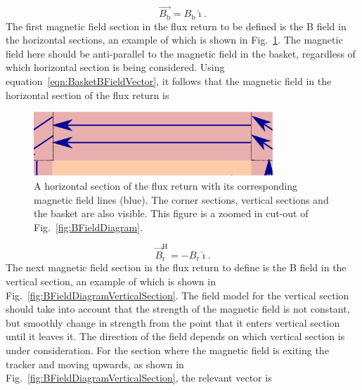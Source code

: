 \begin{equation}
  \overrightarrow{B_{\textrm{b}}} = {B_{\textrm{b}}}\hat{\imath}.
  \label{eqn:BasketBFieldVector}
\end{equation}
The first magnetic field section in the flux return to be defined is the B field in the horizontal sections, an example of which is shown in Fig.~\ref{fig:BFieldDiagramHorizontalSection}.  The magnetic field here should be anti-parallel to the magnetic field in the basket, regardless of which horizontal section is being considered.  Using equation~\ref{eqn:BasketBFieldVector}, it follows that the magnetic field in the horizontal section of the flux return is
\begin{figure}
  \centering
  \includegraphics[width=9cm]{images/magnetic_field/BFieldDiagramHorizontalSection}
  \caption{A horizontal section of the flux return with its corresponding magnetic field lines (blue).  The corner sections, vertical sections and the basket are also visible.  This figure is a zoomed in cut-out of Fig.~\ref{fig:BFieldDiagram}.}
  \label{fig:BFieldDiagramHorizontalSection}
\end{figure}
\begin{equation}
  \overrightarrow{B}^{\textrm{H}}_{\textrm{r}} = -{B_{\textrm{r}}}\hat{\imath}.
  \label{eqn:HorizontalReturnBFieldVector}
\end{equation}
The next magnetic field section in the flux return to define is the B field in the vertical section, an example of which is shown in Fig.~\ref{fig:BFieldDiagramVerticalSection}. The field model for the vertical section should take into account that the strength of the magnetic field is not constant, but smoothly change in strength from the point that it enters vertical section until it leaves it.  The direction of the field depends on which vertical section is under consideration.  For the section where the magnetic field is exiting the tracker and moving upwards, as shown in Fig.~\ref{fig:BFieldDiagramVerticalSection}, the relevant vector is
